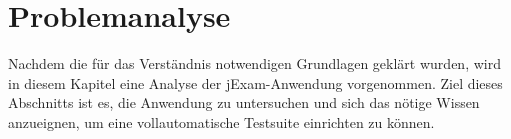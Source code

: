 \chapter{Problemanalyse}\label{ch:problemanalyse}


Nachdem die f\"ur das Verständnis notwendigen Grundlagen gekl\"art wurden,
wird in diesem Kapitel eine Analyse der jExam-Anwendung vorgenommen.
Ziel dieses Abschnitts ist es, die Anwendung zu untersuchen und sich das
n\"otige Wissen anzueignen, um eine vollautomatische Testsuite
einrichten zu k\"onnen.




